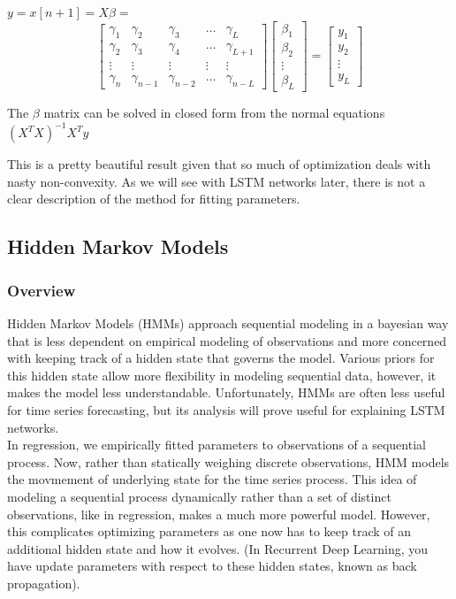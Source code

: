 \documentclass{article}
\begin{document}
$y = x[n+1] = X\beta = $\\
\[
\begin{bmatrix}
    \gamma_{1}       & \gamma_{2} & \gamma_{3} & \dots & \gamma_{L} \\
    \gamma_{2}       & \gamma_{3} & \gamma_{4} & \dots & \gamma_{L+1} \\
    \vdots & \vdots & \vdots &\vdots &\vdots\\
    \gamma_{n}       &  \gamma_{n-1} & \gamma_{n-2} & \dots & \gamma_{n-L}
\end{bmatrix}
\begin{bmatrix}
  \beta_1\\
  \beta_2\\
  \vdots \\
  \beta_L
\end{bmatrix}
=
\begin{bmatrix}
  y_1\\
  y_2\\
  \vdots \\
  y_L
\end{bmatrix}
\]

\noindent The $\beta$ matrix can be solved in closed form from the normal equations $(X^TX)^{-1}X^Ty$

\noindent This is a pretty beautiful result given that so much of optimization deals with nasty non-convexity. As we will see with LSTM networks later, there is not a clear description of the method for fitting parameters.

\subsection{Hidden Markov Models}
\subsubsection{Overview}

Hidden Markov Models (HMMs) approach sequential modeling in a bayesian way that is less dependent on empirical modeling of observations and more concerned with keeping track of a hidden state that governs the model. Various priors for this hidden state allow more flexibility in modeling sequential data, however, it makes the model less understandable. Unfortunately, HMMs are often less useful for time series forecasting, but its analysis will prove useful for explaining LSTM networks.\\

\noindent In regression, we empirically fitted parameters to observations of a sequential process. Now, rather than statically weighing discrete observations, HMM models the movmement of underlying state for the time series process. This idea of modeling a sequential process dynamically rather than a set of distinct observations, like in regression, makes a much more powerful model. However, this complicates optimizing parameters as one now has to keep track of an additional hidden state and how it evolves. (In Recurrent Deep Learning, you have update parameters with respect to these hidden states, known as back propagation).\\
\end{document}
